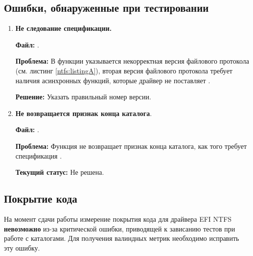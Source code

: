\subsection{Ошибки, обнаруженные при тестировании}
\begin{enumerate}
	\item \textbf{Не следование спецификации.}
	
	\textbf{Файл:} .
	
	\textbf{Проблема:} В функции  указывается некорректная версия файлового протокола (см. листинг \ref{ntfs:listingA}), вторая версия файлового протокола требует наличия асинхронных функций, которые драйвер не поставляет \cite{UEFISpec}.
    
    \textbf{Решение:} Указать правильный номер версии.
	 
	
	\item \textbf{Не возвращается признак конца каталога}.
	
	\textbf{Файл:} .
	
	\textbf{Проблема:} Функция  не возвращает признак конца каталога, как того требует спецификация \cite{UEFISpec}.
	
	\textbf{Текущий статус:} Не решена.
\end{enumerate}

\subsection{Покрытие кода}
На момент сдачи работы измерение покрытия кода для драйвера EFI NTFS \textbf{невозможно} из-за критической ошибки, приводящей к зависанию тестов при работе с каталогами. Для получения валиндных метрик необходимо исправить эту ошибку. 